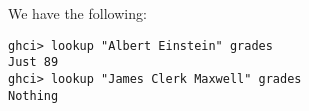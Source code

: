 
We have the following:
\begin{verbatim}
ghci> lookup "Albert Einstein" grades
Just 89
ghci> lookup "James Clerk Maxwell" grades
Nothing
\end{verbatim}
